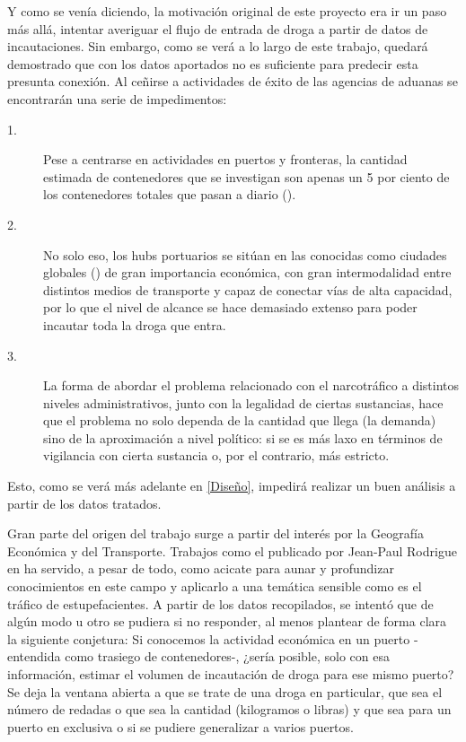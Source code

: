 \documentclass[12pt]{article}
\begin{document}
	Y como se venía diciendo, la motivación original de este proyecto era ir un paso más allá, intentar averiguar el flujo de entrada de droga a partir de datos de incautaciones. Sin embargo, como se verá a lo largo de este trabajo, quedará demostrado que con los datos aportados no es suficiente para predecir esta presunta conexión. Al ceñirse a actividades de éxito de las agencias de aduanas se encontrarán una serie de impedimentos:
	
	\begin{description}
		\item[1.] Pese a centrarse en actividades en puertos y fronteras, la cantidad estimada de contenedores que se investigan son apenas un 5 por ciento de los contenedores totales que pasan a diario (\cite{rodrigue2024geography}).
		\item[2.] No solo eso, los hubs portuarios se sitúan en las conocidas como ciudades globales (\cite{rodrigue2024geography}) de gran importancia económica, con gran intermodalidad entre distintos medios de transporte y capaz de conectar vías de alta capacidad, por lo que el nivel de alcance se hace demasiado extenso para poder incautar toda la droga que entra.
		\item[3.] La forma de abordar el problema relacionado con el narcotráfico a distintos niveles administrativos, junto con la legalidad de ciertas sustancias, hace que el problema no solo dependa de la cantidad que llega (la demanda) sino de la aproximación a nivel político: si se es más laxo en términos de vigilancia con cierta sustancia o, por el contrario, más estricto.
	\end{description}
	
	Esto, como se verá más adelante en \ref{Diseño}, impedirá realizar un buen análisis a partir de los datos tratados.
	
	Gran parte del origen del trabajo surge a partir del interés por la Geografía Económica y del Transporte. Trabajos como el publicado por Jean-Paul Rodrigue en \cite{rodrigue2024geography} ha servido, a pesar de todo, como acicate para aunar y profundizar conocimientos en este campo y aplicarlo a una temática sensible como es el tráfico de estupefacientes. A partir de los datos recopilados, se intentó que de algún modo u otro se pudiera si no responder, al menos plantear de forma clara la siguiente conjetura: Si conocemos la actividad económica en un puerto -entendida como trasiego de contenedores-, ¿sería posible, solo con esa información, estimar el volumen de incautación de droga para ese mismo puerto? Se deja la ventana abierta a que se trate de una droga en particular, que sea el número de redadas o que sea la cantidad (kilogramos o libras) y que sea para un puerto en exclusiva o si se pudiere generalizar a varios puertos.
	 
\end{document}
